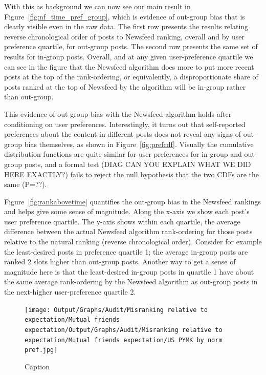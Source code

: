 \documentclass[12pt,letterpaper]{article}
\begin{document}
With this as background we can now see our main result in Figure~\ref{fig:nf_time_pref_group}, which is evidence of out-group bias that is clearly visible even in the raw data. The first row presents the results relating reverse chronological order of posts to Newsfeed ranking, overall and by user preference quartile, for out-group posts. The second row presents the same set of results for in-group posts. Overall, and at any given user-preference quartile we can see in the figure that the Newsfeed algorithm does more to put more recent posts at the top of the rank-ordering, or equivalently, a disproportionate share of posts ranked at the top of Newsfeed by the algorithm will be in-group rather than out-group.

This evidence of out-group bias with the Newsfeed algorithm holds after conditioning on user preferences. Interestingly, it turns out that self-reported preferences about the content in different posts does not reveal any signs of out-group bias themselves, as shown in Figure~\ref{fig:prefcdf}. Visually the cumulative distribution functions are quite similar for user preferences for in-group and out-group posts, and a formal test (DIAG CAN YOU EXPLAIN WHAT WE DID HERE EXACTLY?) fails to reject the null hypothesis that the two CDFs are the same (P=??).

Figure~\ref{fig:rankabovetime} quantifies the out-group bias in the Newsfeed rankings and helps give some sense of magnitude. Along the x-axis we show each post's user preference quartile. The y-axis shows within each quartile, the average difference between the actual Newsfeed algorithm rank-ordering for those posts relative to the natural ranking (reverse chronological order). Consider for example the least-desired posts in preference quartile 1; the average in-group posts are ranked 2 slots higher than out-group posts. Another way to get a sense of magnitude here is that the least-desired in-group posts in quartile 1 have about the same average rank-ordering by the Newsfeed algorithm as out-group posts in the next-higher user-preference quartile 2.

\begin{figure}[h]
    \centering
    \texttt{[image: Output/Graphs/Audit/Misranking relative to expectation/Mutual friends expectation/Output/Graphs/Audit/Misranking relative to expectation/Mutual friends expectation/US PYMK by norm pref.jpg]}
    \caption{Caption}
    \label{fig:pymk_time_pref_group}
\end{figure}
\end{document}
